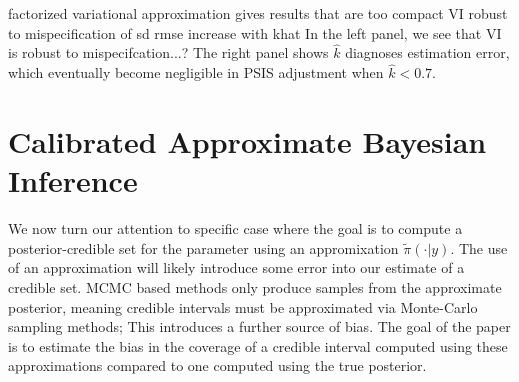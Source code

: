 \documentclass[twoside]{article}
\begin{document}
factorized variational
approximation gives results
that are too compact
VI robust to mispecification of sd
rmse increase with khat
In the left panel, we see that VI is robust to mispecifcation...?
The right panel shows $\hat{k}$ diagnoses estimation error, which eventually become negligible in PSIS adjustment when $\hat{k} < 0.7$. 

\section{Calibrated Approximate Bayesian Inference}
We now turn our attention to specific case where the goal is to compute a posterior-credible set for the parameter using an appromixation $\tilde{\pi}(\cdot|y)$. The use of an approximation will likely introduce some error into our estimate of a credible set. MCMC based methods only produce samples from the approximate posterior, meaning credible intervals must be approximated via Monte-Carlo sampling methods; This introduces a further source of bias. The goal of the paper is to estimate the bias in the coverage of a credible interval computed using these approximations compared to one computed using the true posterior.\\
\end{document}
